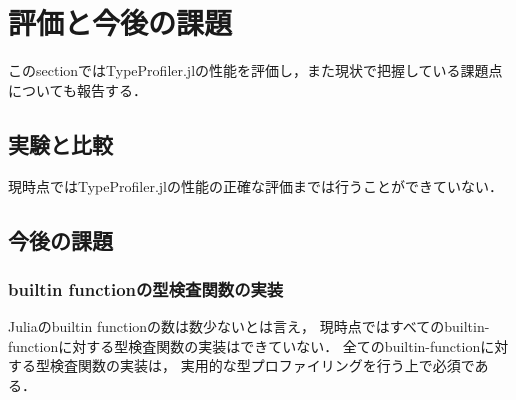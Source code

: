 
\section{評価と今後の課題} \label{section:4}

このsectionではTypeProfiler.jlの性能を評価し，また現状で把握している課題点についても報告する．

\subsection{実験と比較} \label{subsection:experiments-and-comparison}

現時点ではTypeProfiler.jlの性能の正確な評価までは行うことができていない．



\subsection{今後の課題} \label{subsection:issues}


\subsubsection{builtin functionの型検査関数の実装}

Juliaのbuiltin functionの数は数少ないとは言え，
現時点ではすべてのbuiltin-functionに対する型検査関数の実装はできていない．
全てのbuiltin-functionに対する型検査関数の実装は，
実用的な型プロファイリングを行う上で必須である．

